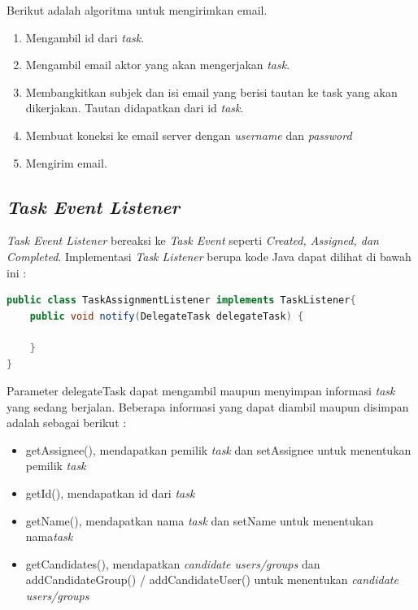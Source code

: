 Berikut adalah algoritma untuk mengirimkan email.
\begin{enumerate}
	\item Mengambil id dari \textit{task}.
	\item Mengambil email aktor yang akan mengerjakan \textit{task}.
	\item Membangkitkan subjek dan isi email yang berisi tautan ke task yang akan dikerjakan. Tautan didapatkan dari id \textit{task}.
	\item Membuat koneksi ke email server dengan \textit{username} dan \textit{password}
	\item Mengirim email.
\end{enumerate}

\subsection{\textit{Task Event Listener}}
\label{sec:perancangansistem_taskeventlistener}
\textit{Task Event Listener} bereaksi ke \textit{Task Event} seperti \textit{Created, Assigned, dan Completed}. Implementasi \textit{Task Listener} berupa kode Java dapat dilihat di bawah ini :
\begin{lstlisting}[language=Java,basicstyle=\tiny,caption=PembangkitJadwal.java]
public class TaskAssignmentListener implements TaskListener{
	public void notify(DelegateTask delegateTask) {
	
	}
}
\end{lstlisting}

Parameter delegateTask dapat mengambil maupun menyimpan informasi \textit{task} yang sedang berjalan. Beberapa informasi yang dapat diambil maupun disimpan adalah sebagai berikut :
\begin{itemize}
	\item getAssignee(), mendapatkan pemilik \textit{task} dan setAssignee untuk menentukan pemilik \textit{task}
	\item getId(), mendapatkan id dari \textit{task}
	\item getName(), mendapatkan nama \textit{task} dan setName untuk menentukan nama\textit{task}
	\item getCandidates(), mendapatkan \textit{candidate users/groups} dan addCandidateGroup() / addCandidateUser() untuk menentukan \textit{candidate users/groups}
	
\end{itemize}
